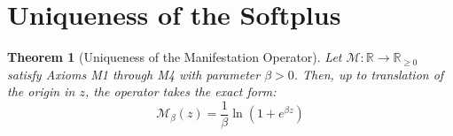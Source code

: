\documentclass[12pt]{article}
\newcommand{\R}{\mathbb{R}}
\newcommand{\Man}{\mathcal{M}}
\newtheorem{theorem}{Theorem}[section]
\theoremstyle{definition}
\theoremstyle{remark}
\begin{document}
\section{Uniqueness of the Softplus}
\label{sec:uniqueness}

\begin{theorem}[Uniqueness of the Manifestation Operator]
\label{thm:uniqueness}
Let $\Man : \R \to \R_{\geq 0}$ satisfy Axioms M1 through M4 with parameter $\beta > 0$. Then, up to translation of the origin in $z$, the operator takes the exact form:
\begin{equation}
\label{eq:softplus}
    \Man_\beta(z) = \frac{1}{\beta}\ln\left(1 + e^{\beta z}\right)
\end{equation}
\end{theorem}
\end{document}
